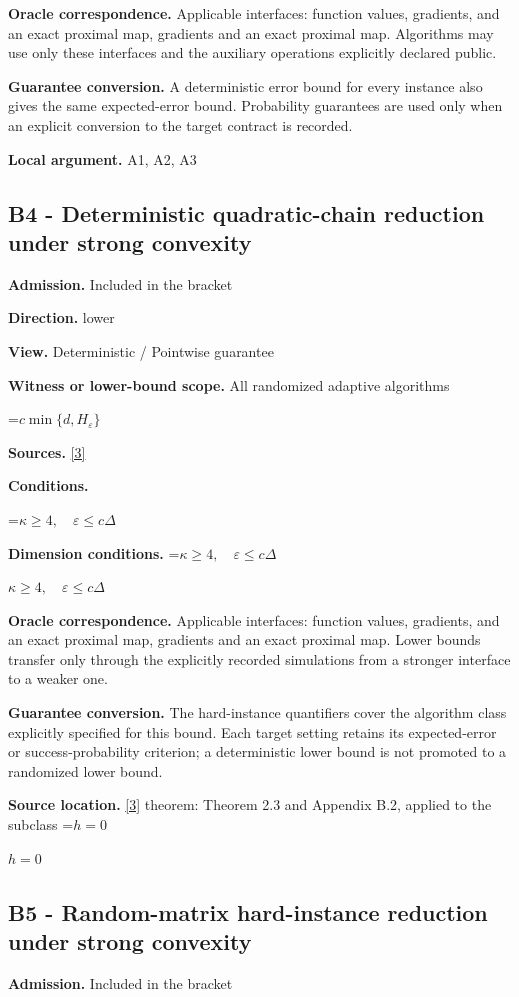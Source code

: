 \documentclass[10pt,a4paper]{article}
\newcommand{\AtlasMath}[1]{\par\begingroup\centering\setbox0=\hbox{$\displaystyle #1$}\ifdim\wd0>1.4\linewidth\typeout{ATLAS WIDE FORMULA: \the\wd0}\fi\ifdim\wd0>\linewidth\resizebox{\linewidth}{!}{\box0}\else\box0\fi\par\endgroup}
\newcommand{\AtlasInlineMath}[1]{\begingroup\setbox0=\hbox{$#1$}\ifdim\wd0>.4\linewidth\endgroup\AtlasMath{#1}\else\endgroup$#1$\fi}
\begin{document}
\textbf{Oracle correspondence.} Applicable interfaces: function values, gradients, and an exact proximal map, gradients and an exact proximal map. Algorithms may use only these interfaces and the auxiliary operations explicitly declared public.

\textbf{Guarantee conversion.} A deterministic error bound for every instance also gives the same expected-error bound. Probability guarantees are used only when an explicit conversion to the target contract is recorded.

\textbf{Local argument.} A1, A2, A3

\subsection{B4 - Deterministic quadratic-chain reduction under strong convexity}
\textbf{Admission.} Included in the bracket

\textbf{Direction.} lower

\textbf{View.} Deterministic / Pointwise guarantee

\textbf{Witness or lower-bound scope.} All randomized adaptive algorithms

\AtlasMath{c\min\{d,H_\varepsilon\}}
\textbf{Sources.} \href{https://arxiv.org/pdf/2609.33360v2}{[3]}

\textbf{Conditions.} 
\AtlasMath{\kappa\ge4,\quad\varepsilon\le c\Delta}


\textbf{Dimension conditions.} \AtlasInlineMath{\kappa\ge4,\quad\varepsilon\le c\Delta}

\textbf{Oracle correspondence.} Applicable interfaces: function values, gradients, and an exact proximal map, gradients and an exact proximal map. Lower bounds transfer only through the explicitly recorded simulations from a stronger interface to a weaker one.

\textbf{Guarantee conversion.} The hard-instance quantifiers cover the algorithm class explicitly specified for this bound. Each target setting retains its expected-error or success-probability criterion; a deterministic lower bound is not promoted to a randomized lower bound.

\textbf{Source location.} \href{https://arxiv.org/pdf/2609.33360v2}{[3]} theorem: Theorem 2.3 and Appendix B.2, applied to the subclass \AtlasInlineMath{h=0}

\subsection{B5 - Random-matrix hard-instance reduction under strong convexity}
\textbf{Admission.} Included in the bracket
\end{document}
